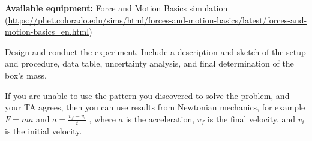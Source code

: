 \textbf{Available equipment:} 
Force and Motion Basics simulation (\url{https://phet.colorado.edu/sims/html/forces-and-motion-basics/latest/forces-and-motion-basics_en.html})

\begin{steps}
	\item Design and conduct the experiment. Include a description and sketch of the setup and procedure, data table, uncertainty analysis, and final determination of the box's mass.
	
	If you are unable to use the pattern you discovered to solve the problem, and your TA agrees, then you can use results from Newtonian mechanics, for example $F = ma$ and $a = \frac{v_f - v_i}{t}$ , where $a$ is the acceleration, $v_f$ is the final velocity, and $v_i$ is the initial velocity.
\end{steps}